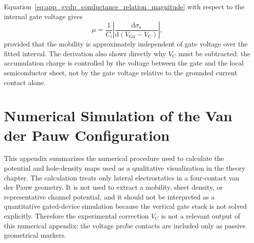 \begin{appendix}
Equation~\eqref{eq:app_gvdp_conductance_relation_magnitude} with respect to the
internal gate voltage gives
\begin{equation}
    \mu
    =\frac{1}{C_\mathrm{i}}
    \left|
    \frac{\mathrm{d}\sigma_\mathrm{s}}
    {\mathrm{d}(V_\mathrm{G4}-V_\mathrm{C})}
    \right|,
    \label{eq:app_gvdp_mobility_slope}
\end{equation}
provided that the mobility is approximately independent of gate voltage over
the fitted interval. The derivation also shows directly why
$V_\mathrm{C}$ must be subtracted: the accumulation charge is controlled by the
voltage between the gate and the local semiconductor sheet, not by the gate
voltage relative to the grounded current contact alone.




\chapter{Numerical Simulation of the Van der Pauw Configuration}
\label{app:vdp_simulation}
\thispagestyle{plain}

This appendix summarizes the numerical procedure used to calculate the
potential and hole-density maps used as a qualitative visualization in the
theory chapter. The calculation treats only lateral electrostatics in a
four-contact van der Pauw geometry. It is not used to extract a mobility, sheet
density, or representative channel potential, and it should not be interpreted
as a quantitative gated-device simulation because the vertical gate stack is not
solved explicitly. Therefore the experimental correction $V_\mathrm{C}$ is not a
relevant output of this numerical appendix; the voltage probe contacts are
included only as passive geometrical markers.


\end{appendix}
